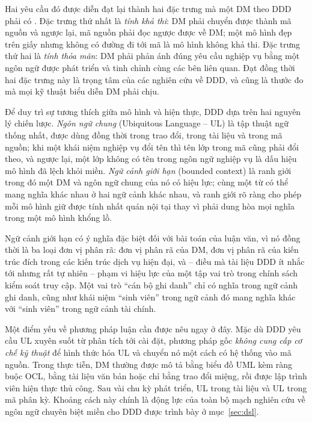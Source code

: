 Hai yêu cầu đó được diễn đạt lại thành hai đặc trưng mà một DM theo DDD phải có \cite{evans2003,vernon2013}. Đặc trưng thứ nhất là \emph{tính khả thi}: DM phải chuyển được thành mã nguồn và ngược lại, mã nguồn phải đọc ngược được về DM; một mô hình đẹp trên giấy nhưng không có đường đi tới mã là mô hình không khả thi. Đặc trưng thứ hai là \emph{tính thỏa mãn}: DM phải phản ánh đúng yêu cầu nghiệp vụ bằng một ngôn ngữ được phát triển và tinh chỉnh cùng các bên liên quan. Đạt đồng thời hai đặc trưng này là trọng tâm của các nghiên cứu về DDD, và cũng là thước đo mà mọi kỹ thuật biểu diễn DM phải chịu.

Để duy trì sự tương thích giữa mô hình và hiện thực, DDD dựa trên hai nguyên lý chiến lược. \emph{Ngôn ngữ chung} (Ubiquitous Language -- UL) là tập thuật ngữ thống nhất, được dùng đồng thời trong trao đổi, trong tài liệu và trong mã nguồn; khi một khái niệm nghiệp vụ đổi tên thì tên lớp trong mã cũng phải đổi theo, và ngược lại, một lớp không có tên trong ngôn ngữ nghiệp vụ là dấu hiệu mô hình đã lệch khỏi miền. \emph{Ngữ cảnh giới hạn} (bounded context) là ranh giới trong đó một DM và ngôn ngữ chung của nó có hiệu lực; cùng một từ có thể mang nghĩa khác nhau ở hai ngữ cảnh khác nhau, và ranh giới rõ ràng cho phép mỗi mô hình giữ được tính nhất quán nội tại thay vì phải dung hòa mọi nghĩa trong một mô hình khổng lồ.

Ngữ cảnh giới hạn có ý nghĩa đặc biệt đối với bài toán của luận văn, vì nó đồng thời là ba loại đơn vị phân rã: đơn vị phân rã của DM, đơn vị phân rã của kiến trúc đích trong các kiến trúc dịch vụ hiện đại, và -- điều mà tài liệu DDD ít nhắc tới nhưng rất tự nhiên -- phạm vi hiệu lực của một tập vai trò trong chính sách kiểm soát truy cập. Một vai trò ``cán bộ ghi danh'' chỉ có nghĩa trong ngữ cảnh ghi danh, cũng như khái niệm ``sinh viên'' trong ngữ cảnh đó mang nghĩa khác với ``sinh viên'' trong ngữ cảnh tài chính.

Một điểm yếu về phương pháp luận cần được nêu ngay ở đây. Mặc dù DDD yêu cầu UL xuyên suốt từ phân tích tới cài đặt, phương pháp gốc \emph{không cung cấp cơ chế kỹ thuật} để hình thức hóa UL và chuyển nó một cách có hệ thống vào mã nguồn. Trong thực tiễn, DM thường được mô tả bằng biểu đồ UML kèm ràng buộc OCL, bằng tài liệu văn bản hoặc chỉ bằng trao đổi miệng, rồi được lập trình viên hiện thực thủ công. Sau vài chu kỳ phát triển, UL trong tài liệu và UL trong mã phân kỳ. Khoảng cách này chính là động lực của toàn bộ mạch nghiên cứu về ngôn ngữ chuyên biệt miền cho DDD được trình bày ở mục~\ref{sec:dsl}.

